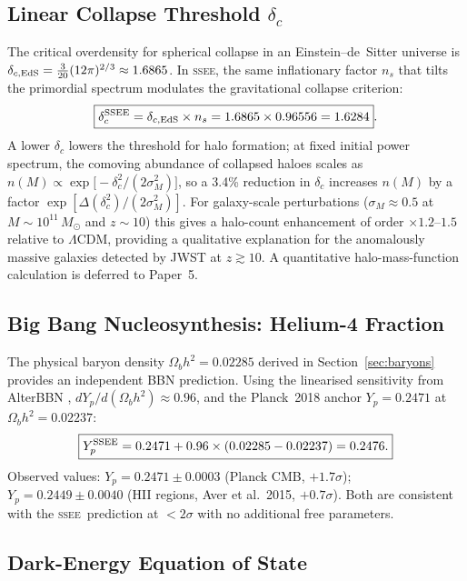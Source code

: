 \documentclass[12pt,a4paper]{article}
\newcommand{\SSEE}{\ifmmode\mathrm{SSEE}\else\textsc{ssee}\fi}
\newcommand{\LCDM}{\ifmmode\Lambda\mathrm{CDM}\else$\Lambda$CDM\fi}
\begin{document}
\subsection{Linear Collapse Threshold $\delta_c$}
\label{sec:deltac}

The critical overdensity for spherical collapse in an Einstein--de~Sitter universe is
$\delta_{c,\rm EdS} = \tfrac{3}{20}(12\pi)^{2/3} \approx 1.6865$.
In \SSEE, the same inflationary factor $n_s$ that tilts the primordial spectrum
modulates the gravitational collapse criterion:
\begin{equation}
\boxed{\delta_c^{\rm SSEE} = \delta_{c,\rm EdS}\times n_s
       = 1.6865\times 0.96556 = 1.6284}.
\label{eq:deltac}
\end{equation}
A lower $\delta_c$ lowers the threshold for halo formation; at fixed initial
power spectrum, the comoving abundance of collapsed haloes scales as
$n(M) \propto \exp\!\bigl[-\delta_c^2/(2\sigma_M^2)\bigr]$, so a 3.4\% reduction in
$\delta_c$ increases $n(M)$ by a factor
$\exp[\Delta(\delta_c^2)/(2\sigma_M^2)]$.
For galaxy-scale perturbations ($\sigma_M\approx 0.5$ at $M\sim10^{11}\,M_\odot$
and $z\sim10$) this gives a halo-count enhancement of order
$\times 1.2$--$1.5$ relative to \LCDM, providing a qualitative explanation
for the anomalously massive galaxies detected by JWST at $z\gtrsim10$.
A quantitative halo-mass-function calculation is deferred to Paper~5.

\subsection{Big Bang Nucleosynthesis: Helium-4 Fraction}
\label{sec:bbn}

The physical baryon density $\Omega_b h^2 = 0.02285$ derived in
Section~\ref{sec:baryons} provides an independent BBN prediction.
Using the linearised sensitivity from AlterBBN \citep{Pisanti2008},
$dY_p/d(\Omega_b h^2) \approx 0.96$, and the Planck~2018 anchor
$Y_p = 0.2471$ at $\Omega_b h^2 = 0.02237$:
\begin{equation}
\boxed{Y_p^{\rm SSEE} = 0.2471 + 0.96\times(0.02285-0.02237) = 0.2476.}
\label{eq:yp}
\end{equation}
Observed values: $Y_p = 0.2471\pm0.0003$ (Planck CMB, $+1.7\sigma$);
$Y_p = 0.2449\pm0.0040$ (HII regions, Aver et al.\ 2015, $+0.7\sigma$).
Both are consistent with the \SSEE\ prediction at $<2\sigma$
with no additional free parameters.

\subsection{Dark-Energy Equation of State}
\label{sec:w0wa}
\end{document}
